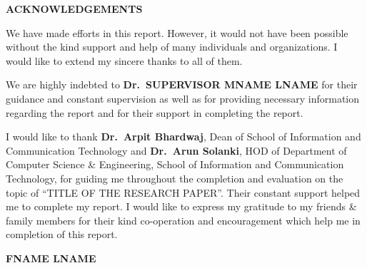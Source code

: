 \begin{center}
	\Huge\uppercase{\textbf{Acknowledgements}}
\end{center}
{
\setlength{\baselineskip}{25pt}

We have made efforts in this report. However, it would not have been possible without the
kind support and help of many individuals and organizations. I would like to extend my
sincere thanks to all of them.

We are highly indebted to \textbf{Dr.~SUPERVISOR MNAME LNAME} for their guidance and constant
supervision as well as for providing necessary information regarding the report and for
their support in completing the report.

I would like to thank \textbf{Dr.~Arpit Bhardwaj}, Dean of School of Information
and Communication Technology and \textbf{Dr.~Arun Solanki}, HOD of Department of Computer Science \&
Engineering, School of Information and Communication Technology, for guiding me
throughout the completion and evaluation on the topic of “TITLE OF THE RESEARCH PAPER”. Their constant
support helped me to complete my report. I would like to express my gratitude to my
friends \& family members for their kind co-operation and encouragement which help me
in completion of this report.

\vspace{1cm}

\hfill \textbf{FNAME LNAME}  %

}
\clearpage
